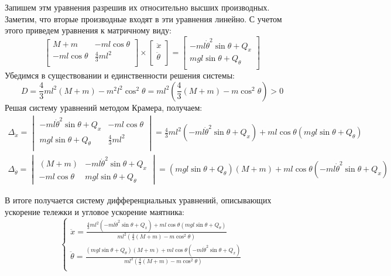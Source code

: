 Запишем этм уравнения разрешив их относительно высших производных. Заметим, что вторые производные 
входят в эти уравнения линейно. С учетом этого приведем уравнения к матричному виду: 
\begin{equation}
    \begin{bmatrix}
        M + m &  -ml\cos\theta \\
        -ml\cos\theta & \frac{4}{3}ml^2 \\ 
    \end{bmatrix} \times
    \begin{bmatrix}
        \ddot{x} \\
        \ddot{\theta} \\
    \end{bmatrix} =
    \begin{bmatrix}
        -ml\dot{\theta}^2\sin\theta + Q_x \\ 
        mgl\sin\theta + Q_{\theta} \\
    \end{bmatrix}
\end{equation}
Убедимся в существовании и единственности решения системы:
\begin{equation}
    D = \frac{4}{3}ml^2(M + m) - m^2l^2\cos^2\theta = ml^2\left(\frac{4}{3}(M + m) - m\cos^2\theta\right) > 0
\end{equation}
Решая систему уравнений методом Крамера, получаем:
\begin{multline}
    \Delta_{\ddot{x}} = \begin{vmatrix}
        -ml\dot{\theta}^2\sin\theta + Q_x & -ml\cos\theta \\
        mgl\sin\theta + Q_{\theta} & \frac{4}{3}ml^2 \\
    \end{vmatrix} = \frac{4}{3}ml^2(-ml\dot{\theta}^2\sin\theta + Q_x) + ml\cos\theta(mgl\sin\theta + Q_{\theta}) 
\end{multline}
\begin{multline}
    \Delta_{\ddot{\theta}} = \begin{vmatrix}
        (M + m) & -ml\dot{\theta}^2\sin\theta + Q_x \\ 
        -ml\cos\theta & mgl\sin\theta + Q_{\theta} 
    \end{vmatrix} = (mgl\sin\theta + Q_{\theta})(M + m) + ml\cos\theta(-ml\dot{\theta}^2\sin\theta + Q_x) 
\end{multline}

В итоге получается систему дифференциальных уравнений, описывающих ускорение тележки и угловое ускорение маятника:
\begin{equation}
    \begin{cases}
        \ddot{x} = \frac{\frac{4}{3}ml^2(-ml\dot{\theta}^2\sin\theta + Q_x) + ml\cos\theta(mgl\sin\theta + Q_{\theta}) }{ml^2(\frac{4}{3}(M + m) - m\cos^2\theta)} \\ 
        \ddot{\theta} = \frac{(mgl\sin\theta + Q_{\theta})(M + m) + ml\cos\theta(-ml\dot{\theta}^2\sin\theta + Q_x) }{ml^2(\frac{4}{3}(M + m) - m\cos^2\theta)} \\ 
    \end{cases}
    \label{eq:nonlinear_model}
\end{equation}

